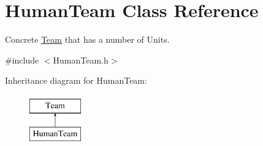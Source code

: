 \hypertarget{class_human_team}{}\section{Human\+Team Class Reference}
\label{class_human_team}


Concrete \hyperlink{class_team}{Team} that has a number of Units.  




{\ttfamily \#include $<$Human\+Team.\+h$>$}

Inheritance diagram for Human\+Team\+:\begin{figure}[H]
\begin{center}
\leavevmode
\includegraphics[height=2.000000cm]{class_human_team}
\end{center}
\end{figure}
